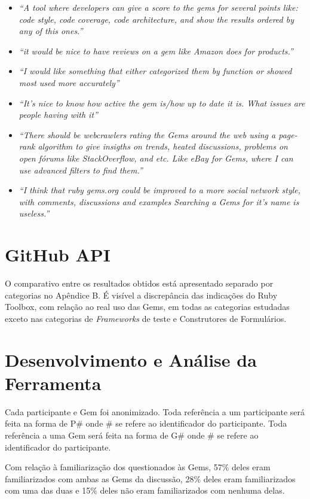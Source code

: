 \begin{itemize}
	\item \textit{``A tool where developers can give a score to the gems for several points like: code style, code coverage, code architecture, and show the results ordered by any of this ones.''}
    \item \textit{``it would be nice to have reviews on a gem like Amazon does for products.''}
    \item \textit{``I would like something that either categorized them by function or showed most used more accurately''}
    \item \textit{``It's nice to know how active the gem is/how up to date it is.  What issues are people having with it''}
    \item \textit{``There should be webcrawlers rating the Gems around the web using a page-rank algorithm to give insigths on trends, heated discussions, problems on open fórums like StackOverflow, and etc. Like eBay for Gems, where I can use advanced filters to find them.''}
    \item \textit{``I think that ruby gems.org could be improved to a more social network style, with comments, discussions and examples
Searching a Gems for it's name is useless.''}
\end{itemize}

\section{GitHub API}

O comparativo entre os resultados obtidos está apresentado separado por categorias no Apêndice B. É visível a discrepância das indicações do Ruby Toolbox, com relação ao real uso das Gems, em todas as categorias estudadas exceto nas categorias de \textit{Frameworks} de teste e Construtores de Formulários.

\section{Desenvolvimento e Análise da Ferramenta}

Cada participante e Gem foi anonimizado. Toda referência a um participante será feita na forma de P\# onde \# se refere ao identificador do participante. Toda referência a uma Gem será feita na forma de G\# onde \# se refere ao identificador do participante.

Com relação à familiarização dos questionados às Gems, 57\% deles eram familiarizados com ambas as Gems da discussão, 28\% deles eram familiarizados com uma das duas e 15\% deles não eram familiarizados com nenhuma delas.


